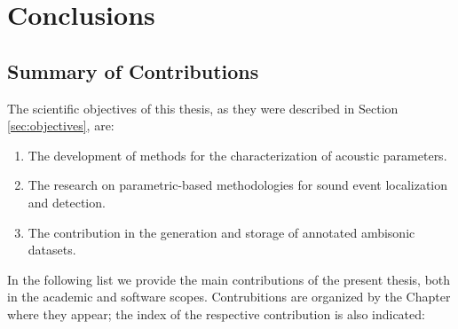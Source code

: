 \chapter{Conclusions}


\section{Summary of Contributions}


 
The scientific objectives of this thesis, as they were described in Section \ref{sec:objectives}, are:

\begin{enumerate}
	\item The development of methods for the characterization of acoustic parameters.
	\item The research on parametric-based methodologies for sound event localization and detection.
	\item The contribution in the generation and storage of annotated ambisonic datasets.
\end{enumerate}

In the following list we provide the main contributions of the present thesis, both in the academic and software scopes. Contrubitions are organized by the Chapter where they appear; the index of the respective contribution is also indicated:
  
